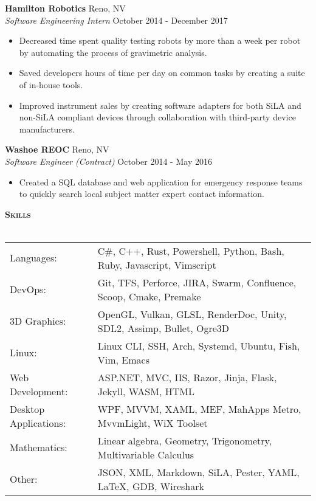 \documentclass[a4paper]{article}
\newcommand{\lineunder} {
    \vspace*{-8pt} \\
    \hspace*{-18pt} \hrulefill \\
}
\newcommand{\header} [1] {
    {\hspace*{-18pt}\vspace*{6pt} \large \textbf{\textsc{#1}}}
    \vspace*{-6pt} \lineunder
    \vspace*{4pt}
}
\begin{document}
\textbf{Hamilton Robotics} \hfill Reno, NV\\
\textit{Software Engineering Intern} \hfill October 2014 - December 2017\\
\vspace{-1mm}
\begin{itemize} \itemsep 1pt
	\item Decreased time spent quality testing robots by more than a week per robot by automating the process of gravimetric analysis.
	\item Saved developers hours of time per day on common tasks by creating a suite of in-house tools.
	\item Improved instrument sales by creating software adapters for both SiLA and non-SiLA compliant devices through collaboration with third-party device manufacturers.
\end{itemize}
\textbf{Washoe REOC} \hfill Reno, NV\\
\textit{Software Engineer (Contract)} \hfill October 2014 - May 2016\\
\vspace{-1mm}
\begin{itemize} \itemsep 1pt
	\item Created a SQL database and web application for emergency response teams to quickly search local subject matter expert contact information.
\end{itemize}

\header{Skills}
\begingroup
\setlength{\tabcolsep}{5pt} %
\renewcommand{\arraystretch}{1.1} %
\begin{tabular}{ l l }
	Languages:            & C\#, C++, Rust, Powershell, Python, Bash, Ruby, Javascript, Vimscript  \strut  \\
	DevOps:               & Git, TFS, Perforce, JIRA, Swarm, Confluence, Scoop, Cmake, Premake \strut      \\
	3D Graphics:          & OpenGL, Vulkan, GLSL, RenderDoc, Unity, SDL2, Assimp, Bullet, Ogre3D \strut    \\
	Linux:                & Linux CLI, SSH, Arch,  Systemd, Ubuntu, Fish, Vim, Emacs   \strut              \\
	Web Development:      & ASP.NET, MVC, IIS, Razor, Jinja, Flask, Jekyll, WASM, HTML  \strut   \\
	Desktop Applications: & WPF, MVVM, XAML, MEF, MahApps Metro, MvvmLight, WiX Toolset \strut             \\
	Mathematics:          & Linear algebra, Geometry, Trigonometry, Multivariable Calculus \strut          \\          
	Other:                & JSON, XML, Markdown, SiLA, Pester, YAML, LaTeX, GDB, Wireshark \strut            \\
\end{tabular}
\endgroup
\vspace{1mm}
\end{document}
